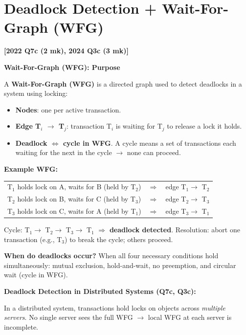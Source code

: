 \documentclass[11pt,a4paper]{article}
\newcommand{\qref}[1]{\textbf{\textcolor{examblue}{[#1]}}}
\newcommand{\mk}[1]{\textcolor{slidegray}{\small(#1 mk)}}
\newcommand{\key}[1]{\textbf{\textcolor{keyred}{#1}}}
\begin{document}
\section{Deadlock Detection + Wait-For-Graph (WFG)}
\qref{2022 Q7c \mk{2}, 2024 Q3c \mk{3}}

\begin{answerbox}
\textbf{Wait-For-Graph (WFG): Purpose}

A \key{Wait-For-Graph (WFG)} is a directed graph used to detect deadlocks in a system using locking:
\begin{itemize}
  \item \textbf{Nodes}: one per active transaction.
  \item \textbf{Edge T$_i$ $\to$ T$_j$}: transaction T$_i$ is waiting for T$_j$ to release a lock it holds.
  \item \textbf{Deadlock $\Leftrightarrow$ cycle in WFG}. A cycle means a set of transactions each waiting for the next in the cycle $\to$ none can proceed.
\end{itemize}

\textbf{Example WFG:}
\begin{center}
\begin{tabular}{lcl}
T$_1$ holds lock on A, waits for B (held by T$_2$) & $\Rightarrow$ & edge T$_1 \to$ T$_2$ \\
T$_2$ holds lock on B, waits for C (held by T$_3$) & $\Rightarrow$ & edge T$_2 \to$ T$_3$ \\
T$_3$ holds lock on C, waits for A (held by T$_1$) & $\Rightarrow$ & edge T$_3 \to$ T$_1$ \\
\end{tabular}
\end{center}
Cycle: T$_1 \to$ T$_2 \to$ T$_3 \to$ T$_1$ $\Rightarrow$ \textbf{deadlock detected}. Resolution: abort one transaction (e.g., T$_3$) to break the cycle; others proceed.

\textbf{When do deadlocks occur?} When all four necessary conditions hold simultaneously: mutual exclusion, hold-and-wait, no preemption, and circular wait (cycle in WFG).

\bigskip
\textbf{Deadlock Detection in Distributed Systems (Q7c, Q3c):}

In a distributed system, transactions hold locks on objects across \emph{multiple servers}. No single server sees the full WFG $\to$ local WFG at each server is incomplete.


\end{answerbox}
\end{document}
